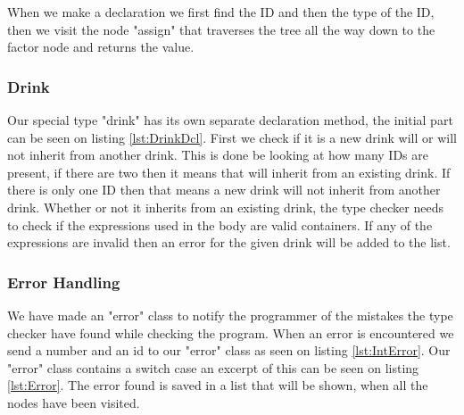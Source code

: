 When we make a declaration we first find the ID and then the type of the ID, then we visit the node "assign" that traverses the tree all the way down to the factor node and returns the value.

\subsubsection{Drink}
Our special type "drink" has its own separate declaration method, the initial part can be seen on listing \ref{lst:DrinkDcl}. First we check if it is a new drink will or will not inherit from another drink. This is done be looking at how many IDs are present, if there are two then it means that will inherit from an existing drink. If there is only one ID then that means a new drink will not inherit from another drink.
Whether or not it inherits from an existing drink, the type checker needs to check if the expressions used in the body are valid containers. If any of the expressions are invalid then an error for the given drink will be added to the list.

\subsubsection{Error Handling}
We have made an "error" class to notify the programmer of the mistakes the type checker have found while checking the program. When an error is encountered we send a number and an id to our "error" class as seen on listing \ref{lst:IntError}.
Our "error" class contains a switch case an excerpt of this can be seen on listing \ref{lst:Error}. The error found is saved in a list that will be shown, when all the nodes have been visited.
